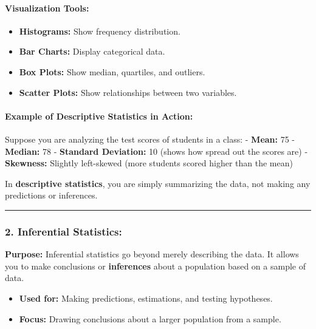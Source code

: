 \documentclass[12pt]{book}
\providecommand{\tightlist}{%
  \setlength{\itemsep}{0pt}\setlength{\parskip}{0pt}}
\begin{document}
\paragraph{\texorpdfstring{\textbf{Visualization
Tools:}}{Visualization Tools:}}\label{visualization-tools}

\begin{itemize}
\tightlist
\item
  \textbf{Histograms:} Show frequency distribution.
\item
  \textbf{Bar Charts:} Display categorical data.
\item
  \textbf{Box Plots:} Show median, quartiles, and outliers.
\item
  \textbf{Scatter Plots:} Show relationships between two variables.
\end{itemize}

\paragraph{\texorpdfstring{\textbf{Example of Descriptive Statistics in
Action:}}{Example of Descriptive Statistics in Action:}}\label{example-of-descriptive-statistics-in-action}

Suppose you are analyzing the test scores of students in a class: -
\textbf{Mean:} 75 - \textbf{Median:} 78 - \textbf{Standard Deviation:}
10 (shows how spread out the scores are) - \textbf{Skewness:} Slightly
left-skewed (more students scored higher than the mean)

In \textbf{descriptive statistics}, you are simply summarizing the data,
not making any predictions or inferences.

\begin{center}\rule{0.5\linewidth}{0.5pt}\end{center}

\subsubsection{\texorpdfstring{\textbf{2. Inferential
Statistics:}}{2. Inferential Statistics:}}\label{inferential-statistics}

\textbf{Purpose:} Inferential statistics go beyond merely describing the
data. It allows you to make conclusions or \textbf{inferences} about a
population based on a sample of data.

\begin{itemize}
\tightlist
\item
  \textbf{Used for:} Making predictions, estimations, and testing
  hypotheses.
\item
  \textbf{Focus:} Drawing conclusions about a larger population from a
  sample.
\end{itemize}
\end{document}
